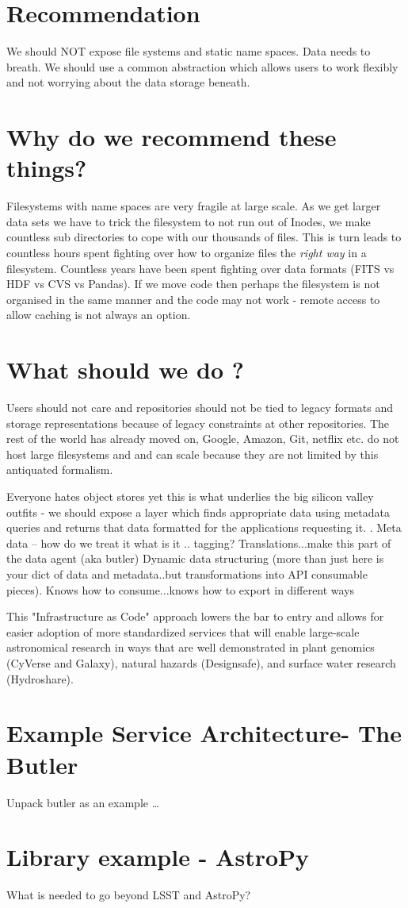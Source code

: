 \section{Recommendation }
We should NOT expose file systems and static name spaces.  Data needs to breath. We should use a common abstraction which allows users to work flexibly and not worrying about the data storage beneath.

\section{Why do we recommend these things?}
Filesystems with name spaces are very fragile at large scale. As we get larger data sets we have to trick the filesystem to not run out of Inodes, we make countless sub directories to cope with our thousands of files.
This is turn leads to countless hours spent fighting over how to organize files  the \emph{right way} in a filesystem.
Countless years have been spent fighting over data formats (FITS vs HDF vs CVS vs Pandas).
If we move code then perhaps the filesystem is not organised in the same manner and the code may not work - remote access to allow caching is not always an option.


\section{What should  we do ?}
Users should not care and repositories should not be tied to legacy formats  and storage representations because of legacy constraints  at other repositories.
The rest of the world has already moved on,  Google, Amazon, Git, netflix etc. do not host large filesystems and and can scale because they are not limited by this antiquated formalism.

Everyone hates object stores  yet this is what underlies the big silicon valley outfits - we should expose a layer which finds appropriate data using metadata queries and returns that data formatted for the applications requesting it.
.
Meta data -- how do we treat it what is it ..  tagging?  Translations...make this part of the data agent (aka butler)
Dynamic data structuring (more than just here is your dict of data and metadata..but transformations into API consumable pieces).  Knows how to consume...knows how to export in different ways

This "Infrastructure as Code" \citep{morris2016infrastructure} approach lowers the bar to entry
and allows for easier adoption of more standardized services that will enable large-scale
astronomical research in ways that are well demonstrated in plant genomics (CyVerse and Galaxy), natural hazards (Designsafe), and surface water research (Hydroshare).


\section{Example Service Architecture- The Butler}
Unpack butler as an example …

\section{Library example - AstroPy}
What is needed to go beyond LSST and AstroPy?


